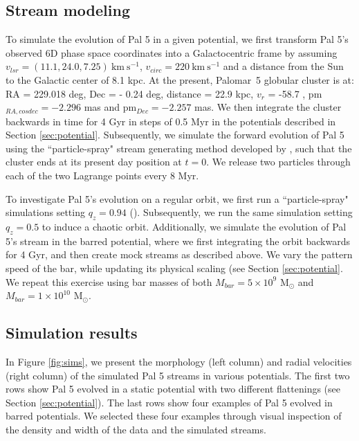 \documentclass[twocolumn]{aastex62}
\newcommand{\msun}{\textrm{M}_\odot}
\newcommand{\kms}{\ensuremath{\textrm{km}~\textrm{s}^{-1}}}
\begin{document}
\subsection{Stream modeling}
\label{sec:modeling}
To simulate the evolution of Pal 5 in a given potential, we first transform Pal 5's observed 6D phase space coordinates into a Galactocentric frame by assuming $v_{lsr} = (11.1, 24.0, 7.25) ~\kms$,  $v_{circ} = 220  ~\kms$ and a distance from the Sun to the Galactic center of 8.1 kpc. 
At the present, Palomar~5 globular cluster is at: RA = 229.018 deg, Dec = - 0.24 deg, distance = 22.9 kpc, $v_r$ = -58.7 , pm$_{RA,cosdec}= -2.296$ mas and pm$_{Dec} = -2.257$ mas.
We then integrate the cluster backwards in time for 4 Gyr in steps of 0.5 Myr in the potentials described in Section \ref{sec:potential}.
Subsequently, we simulate the forward evolution of Pal 5 using the ``particle-spray" stream generating method developed by \citet{Fardal:2015}, such that the cluster ends at its present day position at $t = 0$.
We release two particles through each of the two Lagrange points every 8 Myr. 

To investigate Pal 5's evolution on a regular orbit, we first run a ``particle-spray" simulations setting $q_z = 0.94$ (\citealt{Bovy:2016}).
Subsequently, we run the same simulation setting $q_z = 0.5$ to induce a chaotic orbit.
Additionally, we simulate the evolution of Pal 5's stream in the barred potential, where we first integrating the orbit backwards for 4 Gyr, and then create mock streams as described above.
We vary the pattern speed of the bar, while updating its physical scaling (see Section \ref{sec:potential}. %
We repeat this exercise using bar masses of both $M_{bar} = 5 \times 10^{9}$ $\msun$ and $M_{bar} = 1 \times 10^{10}$ $\msun$.

\subsection{Simulation results}
\label{sec:sim_results}
In Figure \ref{fig:sims}, we present the morphology (left column) and radial velocities (right column) of the simulated Pal 5 streams in various potentials.
The first two rows show Pal 5 evolved in a static potential with two different flattenings (see Section \ref{sec:potential}).
The last rows show four examples of Pal 5 evolved in barred potentials.
We selected these four examples through visual inspection of the density and width of the data and the simulated streams.  
\end{document}
